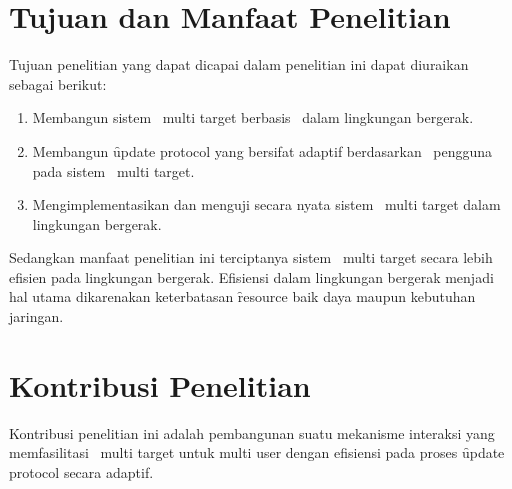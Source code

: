 \section{Tujuan dan Manfaat Penelitian}

Tujuan penelitian yang dapat dicapai dalam penelitian ini dapat diuraikan sebagai
berikut:
\begin{enumerate}
    \item Membangun sistem \tracking~multi target berbasis \pubsub~dalam lingkungan
        bergerak.
    \item Membangun \f{update protocol} yang bersifat adaptif berdasarkan 
        \context~pengguna pada sistem \tracking~multi target.
    \item Mengimplementasikan dan menguji secara nyata sistem \tracking~multi 
        target dalam lingkungan bergerak.
\end{enumerate}



Sedangkan manfaat penelitian ini terciptanya sistem \tracking~multi target
secara lebih efisien pada lingkungan bergerak. Efisiensi dalam lingkungan
bergerak menjadi hal utama dikarenakan keterbatasan \f{resource} baik daya
maupun kebutuhan jaringan.


\section{Kontribusi Penelitian}

Kontribusi penelitian ini adalah pembangunan suatu mekanisme interaksi yang
memfasilitasi \tracking~multi target untuk multi user dengan efisiensi pada
proses \f{update protocol} secara adaptif.
